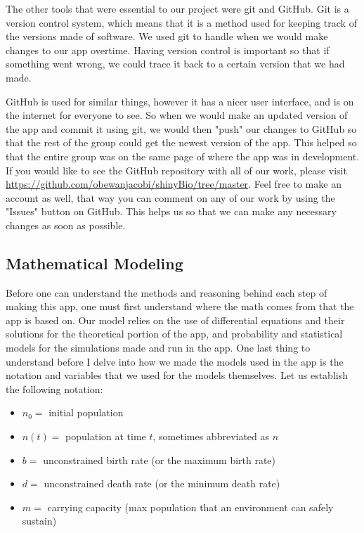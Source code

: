 \documentclass{article}\usepackage[]{graphicx}\usepackage[]{color}
\begin{document}
The other tools that were essential to our project were git and GitHub. Git is a version control system, which means that it is a method used for keeping track of the versions made of software. We used git to handle when we would make changes to our app overtime. Having version control is important so that if something went wrong, we could trace it back to a certain version that we had made. 

GitHub is used for similar things, however it has a nicer user interface, and is on the internet for everyone to see. So when we would make an updated version of the app and commit it using git, we would then "push" our changes to GitHub so that the rest of the group could get the newest version of the app. This helped so that the entire group was on the same page of where the app was in development. If you would like to see the GitHub repository with all of our work, please visit \url{https://github.com/obewanjacobi/shinyBio/tree/master}. Feel free to make an account as well, that way you can comment on any of our work by using the "Issues" button on GitHub. This helps us so that we can make any necessary changes as soon as possible.






\subsection{Mathematical Modeling}

Before one can understand the methods and reasoning behind each step of making this app, one must first understand where the math comes from that the app is based on. Our model relies on the use of differential equations and their solutions for the theoretical portion of the app, and probability and statistical models for the simulations made and run in the app. One last thing to understand before I delve into how we made the models used in the app is the notation and variables that we used for the models themselves. Let us establish the following notation:

\begin{itemize}
\item \(n_0 =\) initial population

\item \(n(t) =\) population at time \(t\), sometimes abbreviated as \(n\)

\item \(b =\) unconstrained birth rate (or the maximum birth rate)

\item \(d =\) unconstrained death rate (or the minimum death rate)

\item \(m =\) carrying capacity (max population that an environment can safely sustain)

\end{itemize}
\end{document}
